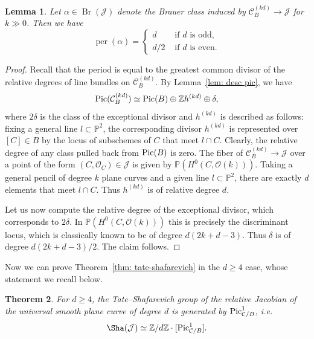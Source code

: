 \documentclass[11pt]{amsart}
\theoremstyle{plain}
\newtheorem{thm}{Theorem}[section]
\newtheorem{lem}[thm]{Lemma}
\theoremstyle{definition}
\theoremstyle{remark}
\DeclareMathOperator{\Br}{Br}
\newcommand{\Pic}{\mathop{\rm Pic}\nolimits}
\begin{document}
\begin{lem}\label{lem: computing period}
    Let $\alpha \in \Br(\mathcal J)$ denote the Brauer class induced by $\mathcal C^{(kd)}_B \to \mathcal J$ for $k\gg 0$. Then we have
    $$\operatorname{per}(\alpha) = \begin{cases}d &\text{ if } d \text{ is odd,} \\d/2 & \text{ if } d \text{ is even}.\end{cases}$$
\end{lem}
\begin{proof}
 Recall that the period is equal to the greatest common divisor of the relative degrees of line bundles on $\mathcal C_B^{(kd)}$. 
 By Lemma~\ref{lem: desc pic}, we have 
 \[
 \Pic(\mathcal C_B^{(kd)}) \simeq \Pic(B) \oplus \mathbb Z h^{(kd)} \oplus\delta,
 \]
    where $2\delta$ is the class of the exceptional divisor and $h^{(kd)}$ is described as follows: fixing a general line $l \subset \mathbb P^2$, the corresponding divisor $h^{(kd)}$ is represented over $[C]\in B$ by the locus of subschemes of $C$ that meet $l \cap C$. Clearly, the relative degree of any class pulled back from $\Pic(B)$ is zero. The fiber of $\mathcal C_B^{(kd)} \to \mathcal{J}$ over a point of the form $(C, \mathcal O_C) \in \mathcal{J}$ is given by $\mathbb P(H^0(C, \mathcal O(k)))$.
    Taking a general pencil of degree $k$ plane curves and a given line $l\subset \mathbb P^2$, there are exactly $d$ elements that meet $l\cap C$. Thus $h^{(kd)}$ is of relative degree $d$.
    
    Let us now compute the relative degree of the exceptional divisor, which corresponds to $2\delta$. In $\mathbb P(H^0(C, \mathcal O(k)))$ this is precisely the discriminant locus, which is classically known to be of degree $d(2k+d-3).$ Thus $\delta$ is of degree $d(2k+d-3)/2$. The claim follows.
\end{proof}

Now we can prove Theorem~\ref{thm: tate-shafarevich} in the $d\geq 4$ case, whose statement we recall below.

\begin{thm}\label{thm: tate-shafarevich main text}
    For $d\geq 4$, the Tate--Shafarevich group of the relative Jacobian of the universal smooth plane curve of degree $d$ is generated by $\Pic^1_{\mathcal C / B}$, i.e.
    $$\Sha(\mathcal{J}) \simeq \mathbb Z / d \mathbb Z \cdot [\Pic^1_{\mathcal C / B}].$$
\end{thm}
\end{document}
